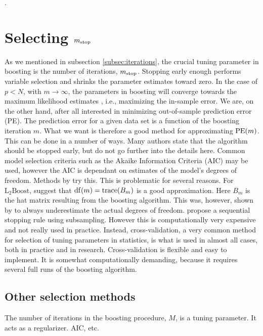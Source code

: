 \citep{mayr-hofner}.

\section{Selecting $m_{\text{stop}}$}
As we mentioned in subsection \ref{subsec:iterations}, the crucial tuning parameter in boosting is the number of iterations, $m_{\text{stop}}$. Stopping early enough performs variable selection and shrinks the parameter estimates toward zero. In the case of $p<N$, with $m\to\infty$, the parameters in boosting will converge towards the maximum likelihood estimates \citep{DeBin2016}, i.e., maximizing the in-sample error. We are, on the other hand, after all interested in minimizing out-of-sample prediction error (PE). The prediction error for a given data set is a function of the boosting iteration $m$. What we want is therefore a good method for approximating $\operatorname{PE}(m)$. This can be done in a number of ways. Many authors state that the algorithm should be stopped early, but do not go further into the details here. Common model selection criteria such as the Akaike Information Criteria (AIC) may be used, however the AIC is dependant on estimates of the model's degrees of freedom. Methods by \citet{chang2010} try this. This is problematic for several reasons. For $\text{L}_2\text{Boost}$, \citet{buhlmann2007} suggest that $\operatorname{df}(m)=\operatorname{trace}(B_m)$ is a good approximation. Here $B_m$ is the hat matrix resulting from the boosting algorithm. This was, however, shown by \citet{hastie2007} to always underestimate the actual degrees of freedom. \citet{mayr-hofner} propose a sequential stopping rule using subsampling. However this is computationally very expensive and not really used in practice. Instead, cross-validation, a very common method for selection of tuning parameters in statistics, is what is used in almost all cases, both in practice and in research. Cross-validation is flexible and easy to implement. It is somewhat computationally demanding, because it requires several full runs of the boosting algorithm.

\subsection{Other selection methods}
The number of iterations in the boosting procedure, $M$, is a tuning parameter. It acts as a regularizer. AIC, etc.

